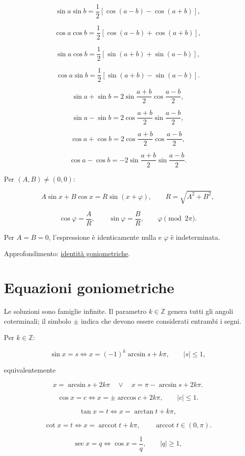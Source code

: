 \[
\sin a\sin b=\frac12[\cos(a-b)-\cos(a+b)],
\]

\[
\cos a\cos b=\frac12[\cos(a-b)+\cos(a+b)],
\]

\[
\sin a\cos b=\frac12[\sin(a+b)+\sin(a-b)],
\]

\[
\cos a\sin b=\frac12[\sin(a+b)-\sin(a-b)].
\]

\[
\sin a+\sin b=2\sin\frac{a+b}{2}\cos\frac{a-b}{2},
\]

\[
\sin a-\sin b=2\cos\frac{a+b}{2}\sin\frac{a-b}{2},
\]

\[
\cos a+\cos b=2\cos\frac{a+b}{2}\cos\frac{a-b}{2},
\]

\[
\cos a-\cos b=-2\sin\frac{a+b}{2}\sin\frac{a-b}{2}.
\]

Per \((A,B)\ne(0,0)\):

\[
A\sin x+B\cos x=R\sin(x+\varphi),
\qquad
R=\sqrt{A^2+B^2},
\]

\[
\cos\varphi=\frac AR,
\qquad
\sin\varphi=\frac BR,
\qquad
\varphi\pmod{2\pi}.
\]

Per \(A=B=0\), l'espressione è identicamente nulla e \(\varphi\) è indeterminata.

Approfondimento: \href{https://ingegnerismo.it/matematica/identita-goniometriche/}{identità goniometriche}.

\section{Equazioni goniometriche}\label{equazioni-goniometriche}

Le soluzioni sono famiglie infinite. Il parametro \(k\in\mathbb Z\) genera tutti gli angoli coterminali; il simbolo \(\pm\) indica che devono essere considerati entrambi i segni.

Per \(k\in\mathbb Z\):

\[
\sin x=s
\Longleftrightarrow
x=(-1)^k\arcsin s+k\pi,
\qquad |s|\le1,
\]

equivalentemente

\[
x=\arcsin s+2k\pi
\quad\lor\quad
x=\pi-\arcsin s+2k\pi.
\]

\[
\cos x=c
\Longleftrightarrow
x=\pm\arccos c+2k\pi,
\qquad |c|\le1.
\]

\[
\tan x=t
\Longleftrightarrow
x=\arctan t+k\pi,
\]

\[
\cot x=t
\Longleftrightarrow
x=\operatorname{arccot}t+k\pi,
\qquad
\operatorname{arccot}t\in(0,\pi).
\]

\[
\sec x=q
\Longleftrightarrow
\cos x=\frac1q,
\qquad |q|\ge1,
\]

